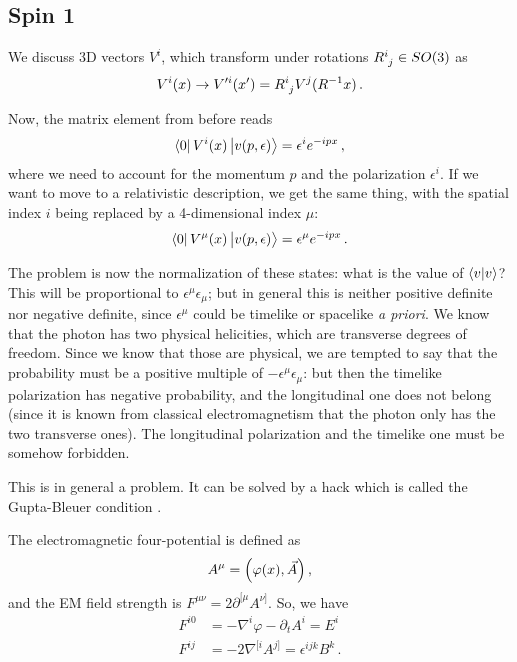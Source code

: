 \documentclass[main.tex]{subfiles}
\begin{document}
\subsection{Spin 1}

We discuss 3D vectors \(V^{i}\), which transform under rotations \(\tensor{R}{^{i}_{j}} \in SO(3)\) as 
%
\begin{align}
V^{i} (x) \rightarrow V^{\prime i} (x') = \tensor{R}{^{i}_{j}} V^{j} (R^{-1}x)
\,.
\end{align}


Now, the matrix element from before reads 
%
\begin{align}
\bra{0} V^{i}(x) \ket{v(p, \epsilon )} = \epsilon^{i} e^{-ipx}
\,,
\end{align}
%
where we need to account for the momentum \(p\) and the polarization \(\epsilon^{i} \). 
If we want to move to a relativistic description, we get the same thing, with the spatial index \(i\) being replaced by a 4-dimensional index \(\mu \):
%
\begin{align}
\bra{0} V^{\mu }(x) \ket{v(p, \epsilon )} = \epsilon^{\mu } e^{-ipx}
\,.
\end{align}

The problem is now the normalization of these states: what is the value of \(\braket{v}{v}\)? 
This will be proportional to  \(\epsilon^{\mu } \epsilon_{\mu }\); but in general this is neither positive definite nor negative definite, since \(\epsilon^{\mu }\) could be timelike or spacelike \emph{a priori}. 
We know that the photon has two physical helicities, which are transverse degrees of freedom.
Since we know that those are physical, we are tempted to say that the probability must be a positive multiple of \(-\epsilon^{\mu }\epsilon_{\mu }\): but then the timelike polarization has negative probability, and the longitudinal one does not belong (since it is known from classical electromagnetism that the photon only has the two transverse ones).
The longitudinal polarization and the timelike one must be somehow forbidden.

This is in general a problem. It can be solved by a hack which is called the Gupta-Bleuer condition \cite[sec.\ 2.8]{tissinoTheoreticalPhysicsNotes2020}.

The electromagnetic four-potential is defined as 
%
\begin{align}
A^{\mu }  = \qty(\varphi (x), \vec{A})
\,,
\end{align}
%
and the EM field strength is \(F^{\mu \nu } = 2 \partial^{[\mu } A^{\nu ]}\). So, we have 
%
\begin{subequations}
\begin{align}
F^{i0} &= - \nabla^{i} \varphi - \partial_{t} A^{i} = E^{i}  \\
 F^{ij} &=  - 2\nabla^{[i} A^{j]} = \epsilon^{ijk} B^{k}
\,.
\end{align}
\end{subequations}
\end{document}
